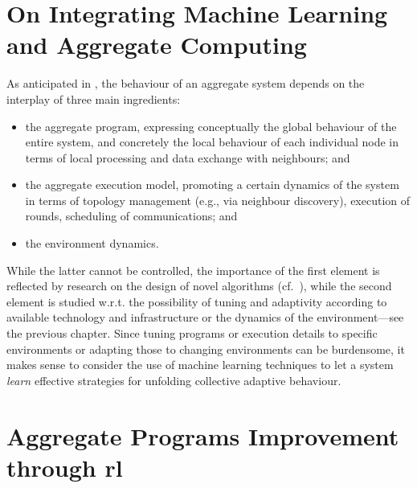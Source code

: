 \section{On Integrating Machine Learning and Aggregate Computing}
As anticipated in , 
 the behaviour of an aggregate system depends on the interplay of three main ingredients:
\begin{itemize}
  \item the aggregate program, expressing conceptually the global behaviour of the entire system, and concretely the local behaviour of each individual node in terms of local processing and data exchange with neighbours; and
  \item the aggregate execution model, promoting a certain dynamics of the system in terms of topology management (e.g., via neighbour discovery), execution of rounds, scheduling of communications; and
  \item  the environment dynamics.
\end{itemize}
%
While the latter cannot be controlled, 
 the importance of the first element is reflected by research
 on the design of novel algorithms (cf.~\cite{DBLP:journals/jlap/ViroliBDACP19,DBLP:conf/saso/AudritoCDV17}),
 while the second element is studied 
 w.r.t. the possibility of tuning and adaptivity 
 according to 
 available technology and infrastructure 
 or the dynamics of the environment---see the previous chapter. %
%
Since tuning programs or execution details to specific environments
 or adapting those to changing environments
 can be burdensome,
 it makes sense to consider the use of machine learning techniques
 to let a system \emph{learn} effective strategies for unfolding collective adaptive behaviour.
%

\section{Aggregate Programs Improvement through \ac{rl}}



